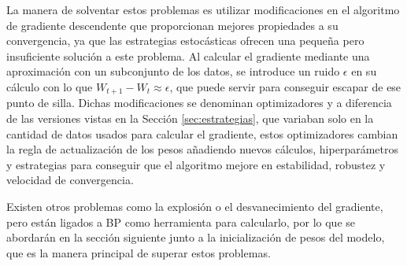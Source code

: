 La manera de solventar estos problemas es utilizar modificaciones en el algoritmo de gradiente descendente que proporcionan mejores propiedades a su convergencia, ya que las estrategias estocásticas ofrecen una pequeña pero insuficiente solución a este problema. Al calcular el gradiente mediante una aproximación con un subconjunto de los datos, se introduce un ruido $\epsilon$ en su cálculo con lo que $W_{t+1} - W_t \approx \epsilon$, que puede servir para conseguir escapar de ese punto de silla. Dichas modificaciones se denominan optimizadores y a diferencia de las versiones vistas en la Sección \ref{sec:estrategias}, que variaban solo en la cantidad de datos usados para calcular el gradiente, estos optimizadores cambian la regla de actualización de los pesos añadiendo nuevos cálculos, hiperparámetros y estrategias para conseguir que el algoritmo mejore en estabilidad, robustez y velocidad de convergencia.


Existen otros problemas como la explosión o el desvanecimiento del gradiente, pero están ligados a BP como herramienta para calcularlo, por lo que se abordarán en la sección siguiente junto a la inicialización de pesos del modelo, que es la manera principal de superar estos problemas. 





